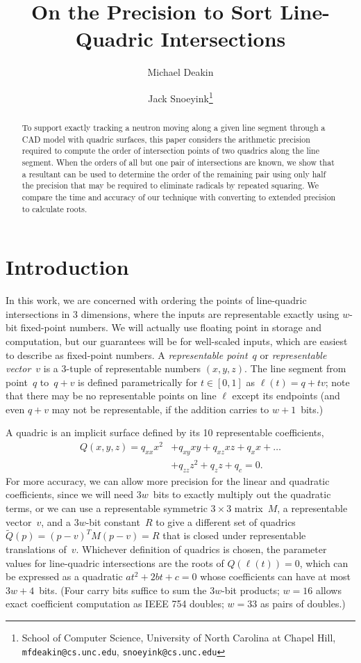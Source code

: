 \documentclass{cccg16}
\title{On the Precision to Sort Line-Quadric Intersections}
\author{Michael Deakin \and Jack Snoeyink\thanks{School of Computer
    Science, University of North Carolina at Chapel Hill, {\tt
      mfdeakin@cs.unc.edu}, {\tt snoeyink@cs.unc.edu}}}
\begin{document}
\thispagestyle{empty}
\maketitle

\begin{abstract}
  To support exactly tracking a neutron moving along a given line
  segment through a CAD model with quadric surfaces, this paper
  considers the arithmetic precision required to compute the order of
  intersection points of two quadrics along the line segment. When the
  orders of all but one pair of intersections are known, we show that
  a resultant can be used to determine the order of the remaining pair
  using only half the precision that may be required to eliminate
  radicals by repeated squaring. We compare the time and accuracy of
  our technique with converting to extended precision to calculate
  roots.
\end{abstract}

\section{Introduction}
In this work, we are concerned with ordering the points of
line-quadric intersections in 3 dimensions, where the inputs are
representable exactly using $w$-bit fixed-point numbers.  We will
actually use floating point in storage and computation, but our
guarantees will be for well-scaled inputs, which are easiest to
describe as fixed-point numbers.  A {\it representable point}~$q$ or
{\it representable vector}~$v$ is a $3$-tuple of representable numbers
$(x, y, z)$. The line segment from point~$q$ to~$q+v$ is defined
parametrically for $t\in [0,1]$ as $\ell(t)=q+tv$; note that there may
be no representable points on line $\ell$ except its endpoints (and
even $q+v$ may not be representable, if the addition carries to
$w+1$~bits.)

A quadric is an implicit surface defined by its 10 representable
coefficients,
\begin{align*}Q(x, y, z)=q_{xx} x^2 &+ q_{xy} xy + q_{xz} xz + q_x x + \dots \\
&+ q_{zz} z^2 + q_{z} z + q_c = 0.
\end{align*}
For more accuracy, we can allow more precision for the linear and
quadratic coefficients, since we will need $3w$~bits to exactly
multiply out the quadratic terms, or we can use a representable
symmetric $3{\times} 3$ matrix~$M$, a representable vector~$v$, and a
$3w$-bit constant~$R$ to give a different set of quadrics $\tilde Q(p)
= (p-v)^TM(p-v) = R$ that is closed under representable translations
of~$v$. Whichever definition of quadrics is chosen, the parameter
values for line-quadric intersections are the roots of $Q(\ell(t))=0$,
which can be expressed as a quadratic $at^2+2bt+c=0$ whose
coefficients can have at most $3w+4$~bits.  (Four carry bits suffice
to sum the $3w$-bit products; $w=16$ allows exact coefficient
computation as IEEE 754 doubles; $w=33$ as pairs of doubles.)
\end{document}
